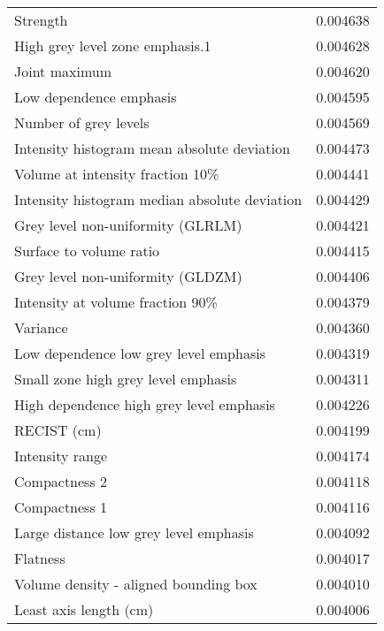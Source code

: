 \begin{tabular}{lr}
Strength                                           &        0.004638 \\
High grey level zone emphasis.1                    &        0.004628 \\
Joint maximum                                      &        0.004620 \\
Low dependence emphasis                            &        0.004595 \\
Number of grey levels                              &        0.004569 \\
Intensity histogram mean absolute deviation        &        0.004473 \\
Volume at intensity fraction 10\%                   &        0.004441 \\
Intensity histogram median absolute deviation      &        0.004429 \\
Grey level non-uniformity (GLRLM)                  &        0.004421 \\
Surface to volume ratio                            &        0.004415 \\
Grey level non-uniformity (GLDZM)                  &        0.004406 \\
Intensity at volume fraction 90\%                   &        0.004379 \\
Variance                                           &        0.004360 \\
Low dependence low grey level emphasis             &        0.004319 \\
Small zone high grey level emphasis                &        0.004311 \\
High dependence high grey level emphasis           &        0.004226 \\
RECIST (cm)                                        &        0.004199 \\
Intensity range                                    &        0.004174 \\
Compactness 2                                      &        0.004118 \\
Compactness 1                                      &        0.004116 \\
Large distance low grey level emphasis             &        0.004092 \\
Flatness                                           &        0.004017 \\
Volume density - aligned bounding box              &        0.004010 \\
Least axis length (cm)                             &        0.004006 \\

\end{tabular}
